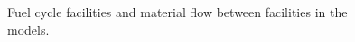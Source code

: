 \begin{frame}
\begin{columns}
\begin{figure}[t]
\begin{tikzpicture}[node distance=0.6cm]
            \end{tikzpicture}
        \caption{Fuel cycle facilities and material flow between facilities in the \Cyclus
        models.}
        \label{fig:fuel_cycle}
    \end{figure}
\end{columns}
\end{frame}

